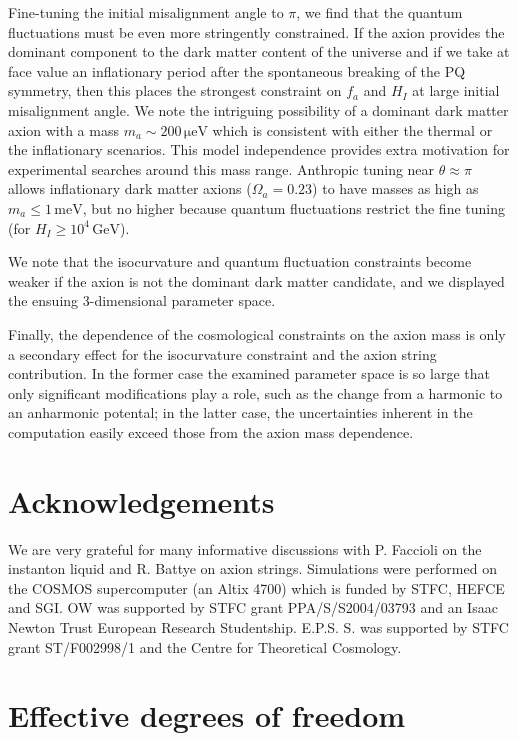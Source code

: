 \documentclass[preprint,nofootinbib]{revtex4}
\newcommand{\units}[1]{\, \mathrm{#1}}
\begin{document}
Fine-tuning the initial misalignment angle to $\pi$, we find that the quantum fluctuations must be even more stringently constrained. If the axion provides the dominant component to the dark matter content of the universe and if we take at face value an inflationary period after the spontaneous breaking of the PQ symmetry, then this places the strongest constraint on $f_a$ and $H_I$ at large initial misalignment angle. We note the intriguing possibility of a dominant dark matter axion with a mass $m_a \sim 200 \units{\mu eV}$ which is consistent with either the thermal or the inflationary scenarios. This model independence provides extra motivation for experimental searches around this mass range. Anthropic tuning near $\theta\approx \pi$ allows inflationary dark matter axions ($\Omega_a = 0.23$) to have masses as high as $m_a\le 1 \units{meV}$, but no higher because quantum fluctuations restrict the fine tuning (for $H_I \ge 10^4 \units{GeV}$).

We note that the isocurvature and quantum fluctuation constraints become weaker if the axion is not the dominant dark matter candidate, and we displayed the ensuing 3-dimensional parameter space. 

Finally, the dependence of the cosmological constraints on the axion mass is only a secondary effect for the isocurvature constraint and the axion string contribution. In the former case the examined parameter space is so large that only significant modifications play a role, such as the change from a harmonic to an anharmonic potental; in the latter case, the uncertainties inherent in the computation easily exceed those from the axion mass dependence.

\section*{Acknowledgements}

We are very grateful for many informative discussions with P. Faccioli on the instanton liquid and R. Battye on axion strings. Simulations were performed on the COSMOS supercomputer (an Altix 4700) which is funded by STFC, HEFCE and SGI. OW was supported by STFC grant PPA/S/S2004/03793 and an Isaac Newton Trust European Research Studentship. E.P.S. S. was supported by STFC grant ST/F002998/1 and the Centre for Theoretical Cosmology.

\appendix
\section{Effective degrees of freedom}
\label{app:geff:fit}
\end{document}
